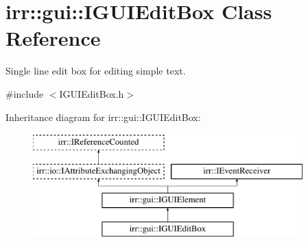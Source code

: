 \hypertarget{classirr_1_1gui_1_1IGUIEditBox}{}\section{irr\+:\+:gui\+:\+:I\+G\+U\+I\+Edit\+Box Class Reference}
\label{classirr_1_1gui_1_1IGUIEditBox}


Single line edit box for editing simple text.  




{\ttfamily \#include $<$I\+G\+U\+I\+Edit\+Box.\+h$>$}

Inheritance diagram for irr\+:\+:gui\+:\+:I\+G\+U\+I\+Edit\+Box\+:\begin{figure}[H]
\begin{center}
\leavevmode
\includegraphics[height=4.000000cm]{classirr_1_1gui_1_1IGUIEditBox}
\end{center}
\end{figure}
